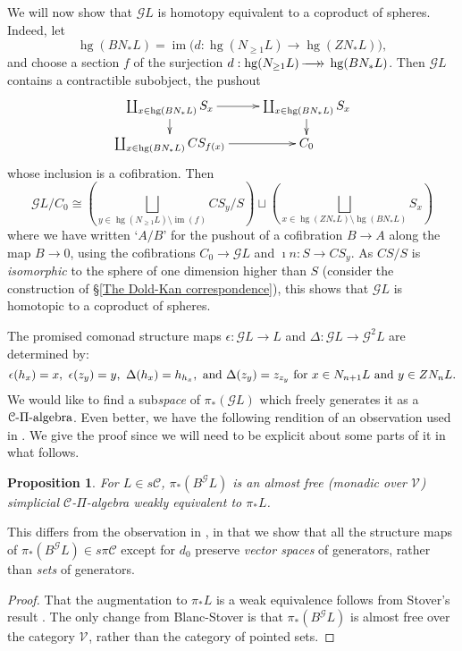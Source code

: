 \documentclass[11pt]{amsart} \renewcommand{\baselinestretch}{1.2}
\theoremstyle{plain}
\newtheorem{prop}[thm]{Proposition}
\numberwithin{equation}{section} %
\theoremstyle{plain}
\newtheorem{prop}[thm]{Proposition}
\numberwithin{equation}{chapter} %
\DeclareMathOperator{\im}{im}
\DeclareMathOperator{\homog}{hg}
\renewcommand{\to}{\longrightarrow}
\newcommand{\scrG}{\mathscr{G}}
\newcommand{\calV}{\mathcal{V}}
\newcommand{\calc}{\mathcal{C}}
\newcommand{\citeBOX}[2][]{\cite[\mbox{#1}]{#2}}
\newcommand{\vect}[2]{\calV^{#1}_{#2}}
\newcommand{\BSW}{{\scrG}}
\newcommand{\PA}[1]{\pi#1}
\newcommand{\epi}{{\,\makebox[0cm][l]{\ensuremath\to}\to{}}}
\newcommand{\bdyinc}{\imath n}
\begin{document}
\begin{Comp funct sseqs}
We will now show that $\BSW L$ is homotopy equivalent to a coproduct of spheres. Indeed,  let \[\homog(BN_*L)=\im \bigl(d:\homog(N_{\geq1}L)\to \homog(ZN_*L)\bigr),\]
 and choose a section $f$ of the surjection $d:\homog(N_{\geq1}L)\epi \homog(BN_*L)$. Then $\BSW L$ contains a contractible subobject, the pushout
\[\xymatrix@R=4mm{
\coprod_{x\in \homog(BN_*L)}S_{ x}
\ar[r]\ar[d]%
&%
\coprod_{x\in \homog(BN_*L)}S_{ x}\ar[d]\\%
\coprod_{x\in \homog(BN_*L)}CS_{ f(x)}
\ar[r]&%
C_0%
}\]
whose inclusion is a cofibration.  Then
\[\BSW L/C_0 \cong \left(\bigsqcup_{y\in \homog(N_{\geq1}L)\setminus\im (f)}CS_{ y}/S\right) \sqcup\left(\bigsqcup_{x\in \homog(ZN_*L)\setminus \homog(BN_*L)}S_{ x}\right)\]
where we have written `$A/B$' for the pushout of a cofibration $B\to A$ along the map $B\to0$, using the cofibrations $C_0\to \BSW L$ and $\bdyinc:S\to CS_{ y}$.
As $CS/S$ is \emph{isomorphic} to the  sphere of one dimension higher than $S$ (consider the construction of \S\ref{The Dold-Kan correspondence}), this shows that $\BSW L$ is homotopic to a coproduct of spheres.

The promised comonad structure maps $\epsilon:\BSW L\to L$ and $\Delta:\BSW L\to \BSW^2L$ are determined by:
\[\epsilon(h_x)=x,\ \epsilon(z_y)=y,\ \Delta(h_x)=h_{h_x},\textup{ and }\Delta(z_y)=z_{z_y}\textup{ for $x\in N_{n+1}L$ and $y\in ZN_nL$.}\]
We would like to find a sub\emph{space} of $\pi_*(\BSW L)$ which freely generates it as a $\calc\textup{-$\Pi$-algebra}$. Even better, we have the following rendition of an observation used in  \cite[Proof of theorem 4.2]{Blanc_Stover-Groth_SS.pdf}. We give the proof since we will need to be explicit about some parts of it in what follows.
\begin{prop}
\label{Id of E2 grothen}
For $L\in s\calc$, $\pi_*(B^{\BSW}L)$ is an almost free (monadic over $\vect{}{}$) simplicial $\calc$-$\Pi$-algebra weakly equivalent to $\pi_*L$.
\end{prop}
\noindent This differs from the observation in \cite[Proof of theorem 4.2]{Blanc_Stover-Groth_SS.pdf}, in that we show that all the structure maps of $\pi_*(B^{\BSW}L)\in s\PA{\calc}$ except for $d_0$ preserve \emph{vector spaces} of generators, rather than \emph{sets} of generators.
\begin{proof}
That the augmentation to $\pi_*L$ is a weak equivalence follows from Stover's result \citeBOX[2.7]{StoverVanKampen.pdf}. The only change from Blanc-Stover is that $\pi_*(B^{\BSW}L)$ is almost free over the category $\vect{}{}$, rather than the category of pointed sets.


\end{proof}
\end{Comp funct sseqs}
\end{document}
